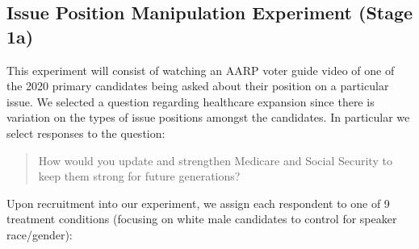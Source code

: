\subsection{Issue Position Manipulation Experiment (Stage 1a)}

This experiment will consist of watching an AARP voter guide video of
one of the 2020 primary candidates being asked about their position on
a particular issue. We selected a question regarding healthcare
expansion since there is variation on the types of issue positions
amongst the candidates. In particular we select responses to the
question:

\begin{quotation}  
How would you update and strengthen Medicare and Social Security to
keep them strong for future generations?
\end{quotation}
  
Upon recruitment into our experiment, we assign each respondent to one
of 9 treatment conditions (focusing on white male candidates to
control for speaker race/gender):


